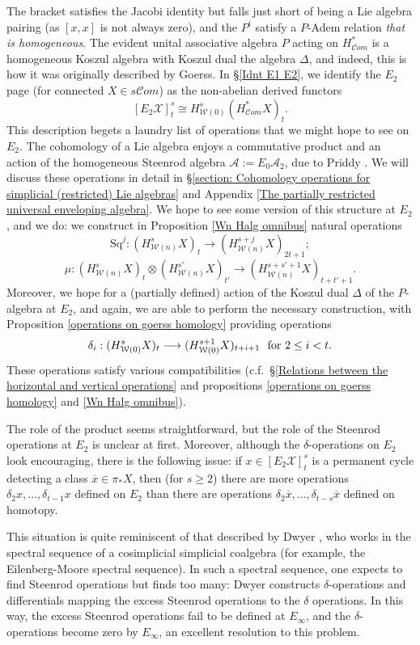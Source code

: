 \documentclass[11pt]{amsart} \renewcommand{\baselinestretch}{1.2}
\theoremstyle{plain}
\theoremstyle{definition}
\renewcommand{\to}{\longrightarrow}
\newcommand{\scrC}{\mathscr{C}}
\newcommand{\calA}{\mathcal{A}}
\newcommand{\calw}{\mathcal{W}}
\newcommand{\cala}{\mathcal{A}}
\newcommand{\calx}{\mathcal{X}}
\newcommand{\Sq}{\mathrm{Sq}}
\newcommand{\LieSteen}{\calA}
\newcommand{\algs}{{\scrC\!\textit{om}}}
\newcommand{\E}[5]{[E^{#1}_{#2}#3]^{#4}_{#5}}
\begin{document}
\begin{Introduction}
The bracket satisfies the Jacobi identity but falls just short of being a Lie algebra pairing (as $[x,x]$ is not always zero), and the $P^i$ satisfy a $P$-Adem relation \emph{that is homogeneous}. The evident unital associative algebra $P$ acting on $H^{*}_{\algs}$ is a homogeneous Koszul algebra with Koszul dual the algebra $\Delta$, and indeed, this is how it was originally described by Goerss. In \S\ref{Idnt E1 E2}, we identify the $E_2$ page (for connected $X\in s\algs$) as the  non-abelian derived functors
\[\E{}{2}{\calx}{s}{t}\cong H^{s}_{\calw(0)}(H^{*}_{\algs}X)_t.\]
This description begets a laundry list of operations that we might hope to see on $E_2$. The cohomology of a Lie algebra enjoys a commutative product and an action of the homogeneous Steenrod algebra $\LieSteen:=E_0\cala_2$, due to Priddy \cite{PriddySimplicialLie.pdf}. We will discuss these operations in detail in \S\ref{section: Cohomology operations for simplicial (restricted) Lie algebras} and Appendix \ref{The partially restricted universal enveloping algebra}. We hope to see some version of this structure at $E_2$, and we do: we construct in Proposition \ref{Wn Halg omnibus} natural operations
\[\Sq^j:(H^s_{\calw(n)}X)_t\to (H^{s+j}_{\calw(n)}X)_{2t+1};\]
\[\mu:(H^s_{\calw(n)}X)_t\otimes (H^{s'}_{\calw(n)}X)_{t'}\to (H^{s+s'+1}_{\calw(n)}X)_{t+t'+1}.\]
Moreover, we hope for a (partially defined) action of the Koszul dual $\Delta$ of the $P$-algebra at $E_2$, and again, we are able to perform the necessary construction, with
Proposition \ref{operations on goerss homology} providing operations 
\[\delta_i:(H^s_{\calw(0)}X)_t\to (H^{s+1}_{\calw(0)}X)_{t+i+1}\textup{ \ for $2\leq i <t$}.\] 
These operations satisfy various compatibilities (c.f.\ \S\ref{Relations between the horizontal and vertical operations} and propositions \ref{operations on goerss homology} and \ref{Wn Halg omnibus}).

The role of the product seems straightforward, but the role of the Steenrod operations at $E_2$ is unclear at first. Moreover, although the $\delta$-operations on $E_2$ look encouraging, there is the following issue: if $x\in \E{}{2}{\calx}{s}{t}$ is  a permanent cycle detecting  a class $\overline{x}\in \pi_*X$, then (for $s\geq2$) there are more operations $\delta_2x,\ldots,\delta_{t-1}x$ defined on $E_2$ than there are operations $\delta_2\overline{x},\ldots,\delta_{t-s}\overline{x}$ defined on homotopy. 

This situation is quite reminiscent of that described by Dwyer \cite{DwyerHigherDividedSquares.pdf}, who works in the spectral sequence of a cosimplicial simplicial coalgebra (for example, the Eilenberg-Moore spectral sequence). In such a spectral sequence, one expects to find Steenrod operations but finds too many: Dwyer constructs $\delta$-operations and differentials mapping the excess Steenrod operations to the $\delta$ operations. In this way, the excess Steenrod operations fail to be defined at $E_\infty$, and the $\delta$-operations become zero by $E_\infty$, an excellent resolution to this problem.


\end{Introduction}
\end{document}
